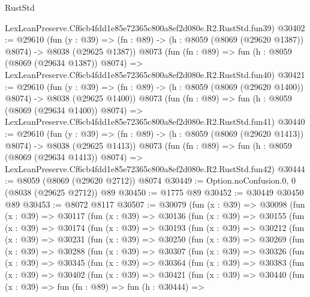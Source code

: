 \begin{lexlean}{RustStd}
\begin{coremodule}
    LexLeanPreserve.Cf6cb4fdd1e85e72365c800a8ef2d080e.R2.RustStd.fun39)
@30402 := @29610
    (fun (y : @39) =>
    (fn : @89) -> (h : @8059 (@8069 (@29620 @1387)) @8074) -> @8038 (@29625 @1387))
    @8073
    (fun (fn : @89) =>
    fun (h : @8059 (@8069 (@29634 @1387)) @8074) =>
    LexLeanPreserve.Cf6cb4fdd1e85e72365c800a8ef2d080e.R2.RustStd.fun40)
@30421 := @29610
    (fun (y : @39) =>
    (fn : @89) -> (h : @8059 (@8069 (@29620 @1400)) @8074) -> @8038 (@29625 @1400))
    @8073
    (fun (fn : @89) =>
    fun (h : @8059 (@8069 (@29634 @1400)) @8074) =>
    LexLeanPreserve.Cf6cb4fdd1e85e72365c800a8ef2d080e.R2.RustStd.fun41)
@30440 := @29610
    (fun (y : @39) =>
    (fn : @89) -> (h : @8059 (@8069 (@29620 @1413)) @8074) -> @8038 (@29625 @1413))
    @8073
    (fun (fn : @89) =>
    fun (h : @8059 (@8069 (@29634 @1413)) @8074) =>
    LexLeanPreserve.Cf6cb4fdd1e85e72365c800a8ef2d080e.R2.RustStd.fun42)
@30444 := @8059 (@8069 (@29620 @2712)) @8074
@30449 := Option.noConfusion.{0, 0} (@8038 (@29625 @2712)) @89
@30450 := @1775 @89
@30452 := @30449 @30450 @89
@30453 := @8072 @8117
@30507 := @30079
    (fun (x : @39) =>
    @30098
      (fun (x : @39) =>
      @30117
        (fun (x : @39) =>
        @30136
          (fun (x : @39) =>
          @30155
            (fun (x : @39) =>
            @30174
              (fun (x : @39) =>
              @30193
                (fun (x : @39) =>
                @30212
                  (fun (x : @39) =>
                  @30231
                    (fun (x : @39) =>
                    @30250
                      (fun (x : @39) =>
                      @30269
                        (fun (x : @39) =>
                        @30288
                          (fun (x : @39) =>
                          @30307
                            (fun (x : @39) =>
                            @30326
                              (fun (x : @39) =>
                              @30345
                                (fun (x : @39) =>
                                @30364
                                  (fun (x : @39) =>
                                  @30383
                                    (fun (x : @39) =>
                                    @30402
                                      (fun (x : @39) =>
                                      @30421
                                        (fun (x : @39) =>
                                        @30440
                                          (fun (x : @39) =>
                                          fun (fn : @89) =>
                                          fun (h : @30444) =>

\end{coremodule}
\end{lexlean}
